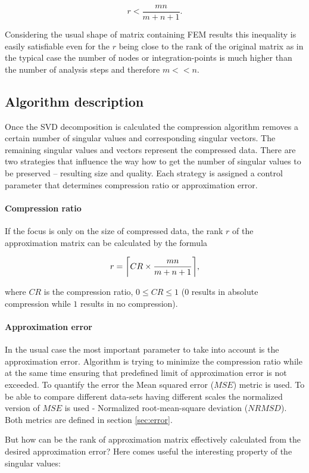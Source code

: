 $$r<\frac{m n}{m+n+1}.$$

Considering the usual shape of matrix containing FEM results this inequality is easily satisfiable even for the $r$ being close to the rank of the original matrix as in the typical case the number of nodes or integration-points is much higher than the number of analysis steps and therefore $m<<n$.

\subsection{Algorithm description}
Once the SVD decomposition is calculated the compression algorithm removes a certain number of singular values and corresponding singular vectors. The remaining singular values and vectors represent the compressed data. There are two strategies that influence the way how to get the number of singular values to be preserved -- resulting size and quality. Each strategy is assigned a control parameter that determines compression ratio or approximation error.

\paragraph{Compression ratio}
If the focus is only on the size of compressed data, the rank $r$ of the approximation matrix can be calculated by the formula

\begin{equation}
r=\ceil*{CR \times \frac{m n}{m+n+1}},
\end{equation}

where $CR$ is the compression ratio, $0 \leq CR \leq 1$ ($0$ results in absolute compression while $1$ results in no compression).

\paragraph{Approximation error}
In the usual case the most important parameter to take into account is the approximation error. Algorithm is trying to minimize the compression ratio while at the same time ensuring that predefined limit of approximation error is not exceeded. To quantify the error the Mean squared error ($MSE$) metric is used. To be able to compare different data-sets having different scales the normalized version of $MSE$ is used - Normalized root-mean-square deviation ($NRMSD$). Both metrics are defined in section \ref{sec:error}.

But how can be the rank of approximation matrix effectively calculated from the desired approximation error? Here comes useful the interesting property of the singular values:

